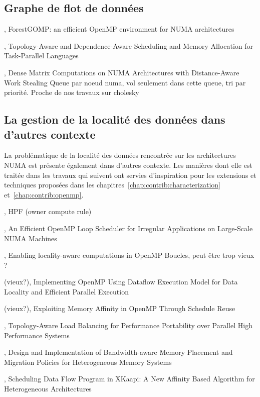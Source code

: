 \subsection{Graphe de flot de données}

\cite{Broquedis2010a}, ForestGOMP: an efficient OpenMP environment for NUMA architectures

\cite{Drebes2014}, Topology-Aware and Dependence-Aware Scheduling and Memory Allocation for Task-Parallel Languages

\cite{Al-Omairy2015}, Dense Matrix Computations on NUMA Architectures with Distance-Aware Work Stealing
Queue par noeud numa, vol seulement dans cette queue, tri par priorité.
Proche de nos travaux sur cholesky


\subsection{La gestion de la localité des données dans d'autres contexte}

La problématique de la localité des données rencontrée sur les architectures NUMA est présente également dans d'autres contexte.
Les manières dont elle est traitée dans les travaux qui suivent ont servies d'inspiration pour les extensions et techniques proposées dans les chapitres~\ref{chap:contrib:characterization} et~\ref{chap:contrib:openmp}.

\cite{HPF}, HPF (owner compute rule)

\cite{Durand2013}, An Efficient OpenMP Loop Scheduler for Irregular Applications on Large-Scale NUMA Machines

\cite{Huang2010}, Enabling locality-aware computations in OpenMP
Boucles, peut être trop vieux ?


(vieux?)\cite{Weng2002}, Implementing OpenMP Using Dataflow Execution Model for Data Locality and Efficient Parallel Execution

(vieux?)\cite{Nikolopoulos2001}, Exploiting Memory Affinity in OpenMP Through Schedule Reuse

\cite{Pilla2014}, Topology-Aware Load Balancing for Performance Portability over Parallel High Performance Systems

\cite{Yu2017}, Design and Implementation of Bandwidth-aware Memory Placement and Migration Policies for Heterogeneous Memory Systems


\cite{Bleuse2014}, Scheduling Data Flow Program in XKaapi: A New Affinity Based Algorithm for Heterogeneous Architectures

